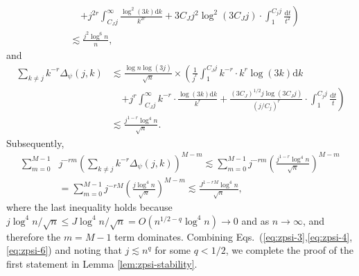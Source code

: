 \documentclass[aos]{imsart}
\newcommand{\ud}{\mathrm d}
\theoremstyle{plain}
\theoremstyle{definition}
\theoremstyle{definition}
\begin{document}
\begin{appendix}
\begin{align}
&\;\;\;\;\left.+ j^{2r}\int_{C_J j}^{\infty}\frac{\log^2(3k)\ud k}{k^{2r}} + 3C_J j^2\log^2(3C_Jj)\cdot \int_1^{C_j j}\frac{\ud t}{t^2}\right)\nonumber\\
&\lesssim \frac{j^2\log^6 n}{n},\label{eq:zpsi-4}
\end{align}
and 
\begin{align}
\sum_{k\neq j}k^{-r}\Delta_\psi(j,k) &\lesssim  \frac{\log n\log(3j)}{\sqrt{n}}\times \left( \frac{1}{j^{r}}\int_1^{C_J j}k^{-r}\cdot k^{r}\log(3k)\ud k \right.\nonumber\\
&\;\;\;\;\left.+ j^{r}\int_{C_J j}^{\infty}k^{-r}\cdot\frac{\log(3k)\ud k}{k^{r}} + \frac{(3C_J)^{1/2} j\log(3C_Jj)}{(j/C_j)^{r}}\cdot \int_1^{C_j j}\frac{\ud t}{t}\right)\nonumber\\
&\lesssim \frac{j^{1-r}\log^{4}n}{\sqrt{n}}.\label{eq:zpsi-5}
\end{align}
Subsequently,
\begin{align}
\sum_{m=0}^{M-1}& j^{-rm}\left(\sum_{k\neq j}k^{-r}\Delta_\psi(j,k)\right)^{M-m}
\lesssim \sum_{m=0}^{M-1}j^{-rm}\left(\frac{j^{1-r}\log^4 n}{\sqrt{n}}\right)^{M-m}\nonumber\\
&= \sum_{m=0}^{M-1}j^{-rM}\left(\frac{j\log^4 n}{\sqrt{n}}\right)^{M-m} \lesssim \frac{J^{1-rM}\log^4 n}{\sqrt{n}},
\label{eq:zpsi-6}
\end{align}
where the last inequality holds because $j\log^4n/\sqrt{n}\leq J\log^4 n/\sqrt{n} = O(n^{1/2-q}\log^4 n)\to 0$ and as $n\to\infty$, and therefore the $m=M-1$ term dominates.
Combining Eqs.~(\ref{eq:zpsi-3},\ref{eq:zpsi-4},\ref{eq:zpsi-6}) and noting that $j\lesssim n^q$ for some $q<1/2$, we complete the proof of the first statement in Lemma \ref{lem:zpsi-stability}.


\end{appendix}
\end{document}
